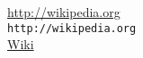 \documentclass{book}
\begin{document}

\url{http://wikipedia.org} \\
\nolinkurl{http://wikipedia.org} \\
\href{http://wikipedia.org}{Wiki}  %









\end{document}
